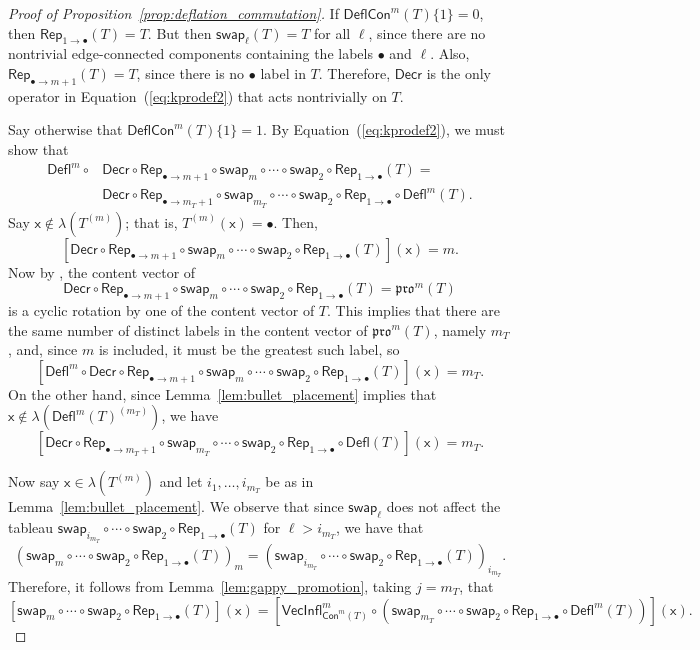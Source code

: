 \documentclass[12pt]{amsart}
\newcommand{\x}{\ensuremath{\mathsf{x}}}
\theoremstyle{definition}
\theoremstyle{remark}
\numberwithin{equation}{section}
\newcommand{\pro}{\mathfrak{pro}}
\newcommand{\swap}{\ensuremath{\mathsf{swap}}}
\newcommand{\decr}{\ensuremath{\mathsf{Decr}}}
\newcommand{\rep}{\ensuremath{\mathsf{Rep}}}
\newcommand{\deflate}{\ensuremath{\mathsf{Defl}}}
\newcommand{\inflate}{\ensuremath{\mathsf{VecInfl}}}
\newcommand{\content}{\ensuremath{\mathsf{Con}}}
\newcommand{\compress}{\ensuremath{\mathsf{DeflCon}}}
\begin{document}
\begin{proof}[Proof of Proposition~\ref{prop:deflation_commutation}]
If $\compress^m(T)\lbrace 1 \rbrace = 0$, then $\rep_{1 \rightarrow \bullet}(T) = T$. But then $\swap_\ell(T) = T$ for all $\ell$, since there are no nontrivial edge-connected components containing the labels $\bullet$ and $\ell$. Also, $\rep_{\bullet \rightarrow m+1}(T) = T$, since there is no $\bullet$ label in $T$. Therefore, $\decr$ is the only operator in Equation~(\ref{eq:kprodef2}) that acts nontrivially on $T$. 


Say otherwise that $\compress^m(T)\lbrace 1 \rbrace = 1$. By Equation~(\ref{eq:kprodef2}), we must show that
\begin{align*}
\deflate^m \circ &\decr \circ \rep_{\bullet \rightarrow m+1} \circ \swap_m \circ \cdots \circ \swap_2\circ \rep_{1 \rightarrow \bullet} (T) = \\
 & \decr \circ \rep_{\bullet \rightarrow m_T+1} \circ \swap_{m_T} \circ \cdots \circ \swap_2 \circ \rep_{1 \rightarrow \bullet} \circ \deflate^m (T). 
\end{align*}
Say $\x \not \in \lambda(T^{(m)})$; that is,  $T^{(m)}(\x) = \bullet$.  Then,
\[
[\decr \circ \rep_{\bullet \rightarrow m+1} \circ \swap_m \circ \cdots \circ \swap_2 \circ \rep_{1 \rightarrow \bullet} (T)](\x) = m.
\]
Now by \cite[Lemma~2.1]{DPS}, the content vector of  
\[
\decr \circ \rep_{\bullet \rightarrow m+1} \circ \swap_m \circ \cdots \circ \swap_2 \circ \rep_{1 \rightarrow \bullet} (T) = \pro^m(T)
\]
 is a cyclic rotation by one of the content vector of $T$. This implies that there are the same number of distinct labels in the content vector of $\pro^m(T)$, namely $m_T$, and, since $m$ is included, it must be the greatest such label, so 
 \[
 [\deflate^m \circ \decr \circ \rep_{\bullet \rightarrow m+1} \circ \swap_m \circ \cdots \circ \swap_2 \circ \rep_{1 \rightarrow \bullet} (T)](\x) = m_T.
 \]
  On the other hand, since Lemma~\ref{lem:bullet_placement} implies that $\x \not \in \lambda(\deflate^m(T)^{(m_T)})$, we have
  \[
  [\decr \circ \rep_{\bullet \rightarrow m_T + 1} \circ \swap_{m_T} \circ \cdots \circ \swap_2 \circ \rep_{1 \rightarrow \bullet} \circ \deflate(T)](\x) = m_T.
  \] 

Now say $\x \in \lambda(T^{(m)})$ and let $i_1, \ldots, i_{m_T}$ be as in Lemma~\ref{lem:bullet_placement}. We observe that since $\swap_\ell$ does not affect the tableau $\swap_{i_{m_T}} \circ \cdots \circ \swap_2 \circ \rep_{1 \rightarrow \bullet} (T)$ for $\ell > i_{m_T}$, we have that
\[ (\swap_m \circ \cdots \circ \swap_2 \circ \rep_{1 \rightarrow \bullet}( T ))_m = (\swap_{i_{m_T}} \circ \cdots \circ \swap_2 \circ \rep_{1 \rightarrow \bullet}( T ))_{i_{m_T}}.  \]
Therefore, it follows from Lemma~\ref{lem:gappy_promotion}, taking $j = m_T$, that 
\[ [\swap_m \circ \cdots \circ \swap_2 \circ \rep_{1 \rightarrow \bullet}( T )](\x) = [\inflate^m_{\content^m(T)} \circ (\swap_{m_T} \circ \cdots \circ   \swap_2  \circ \rep_{1 \rightarrow \bullet} \circ \deflate^m(T))](\x). \]


\end{proof}
\end{document}
